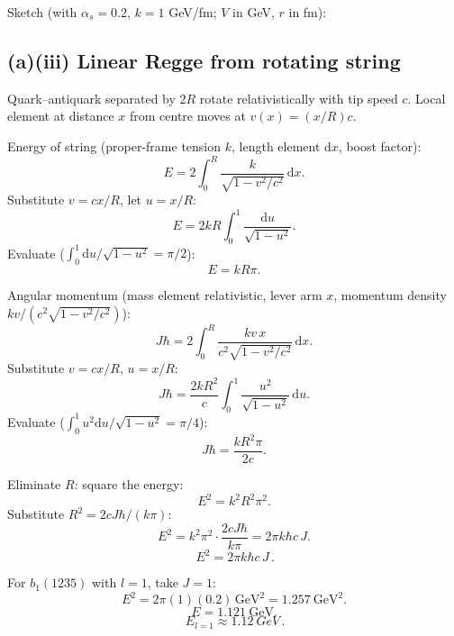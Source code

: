 \documentclass[11pt]{article}
\newcommand{\de}{\mathrm{d}}
\begin{document}
Sketch (with $\alpha_s=0.2$, $k=1$ GeV/fm; $V$ in GeV, $r$ in fm):

\begin{center}
\end{center}

\subsection*{(a)(iii) Linear Regge from rotating string}

Quark--antiquark separated by $2R$ rotate relativistically with tip speed $c$. Local element at distance $x$ from centre moves at $v(x) = (x/R)c$.

Energy of string (proper-frame tension $k$, length element $\de x$, boost factor):
\[ E = 2\!\int_0^R \frac{k}{\sqrt{1-v^2/c^2}}\,\de x. \]
Substitute $v=cx/R$, let $u=x/R$:
\[ E = 2kR\int_0^1 \frac{\de u}{\sqrt{1-u^2}}. \]
Evaluate ($\int_0^1\!\de u/\sqrt{1-u^2}=\pi/2$):
\[ E = kR\pi. \]

Angular momentum (mass element relativistic, lever arm $x$, momentum density $kv/(c^2\sqrt{1-v^2/c^2})$):
\[ J\hbar = 2\!\int_0^R \frac{k v\,x}{c^2\sqrt{1-v^2/c^2}}\,\de x. \]
Substitute $v=cx/R$, $u=x/R$:
\[ J\hbar = \frac{2k R^2}{c}\int_0^1 \frac{u^2}{\sqrt{1-u^2}}\,\de u. \]
Evaluate ($\int_0^1\!u^2\de u/\sqrt{1-u^2}=\pi/4$):
\[ J\hbar = \frac{k R^2 \pi}{2c}. \]

Eliminate $R$: square the energy:
\[ E^2 = k^2 R^2 \pi^2. \]
Substitute $R^2 = 2cJ\hbar/(k\pi)$:
\[ E^2 = k^2\pi^2\cdot\frac{2cJ\hbar}{k\pi} = 2\pi k\hbar c\, J. \]
\[ \boxed{\,E^2 = 2\pi k\hbar c\, J\,}. \]

For $b_1(1235)$ with $l=1$, take $J=1$:
\[ E^2 = 2\pi(1)(0.2)\,\mathrm{GeV}^2 = 1.257\ \mathrm{GeV^2}. \]
\[ E = 1.121\ \mathrm{GeV}. \]
\[ \boxed{\,E_{l=1}\approx \SI{1.12}{GeV}\,}. \]
\end{document}
